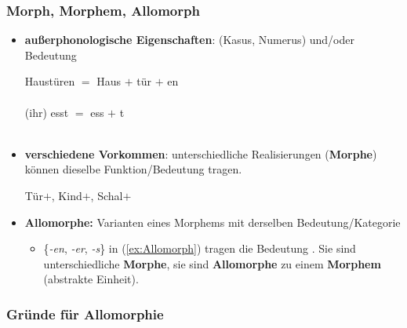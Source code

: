 \begin{frame}
\frametitle{Morph, Morphem, Allomorph}

\begin{itemize}
	\item \textbf{außerphonologische Eigenschaften}:  (\zB Kasus, Numerus) und/oder  Bedeutung
	
	\ea
		\ea
%		
		\gll Haustüren $=$ Haus $+$ tür $+$ en \\
		{} {}  {}  {}  \\
		
		\ex	
		\gll (ihr) esst $=$ ess $+$ t \\
		{} {} {}  {} \\
		
		\z
	\z 

\pause 
	
	\item \textbf{verschiedene Vorkommen}: unterschiedliche Realisierungen (\textbf{Morphe}) können dieselbe Funktion/Bedeutung tragen.
	
	\ea\label{ex:Allomorph} Tür$+$, Kind$+$, Schal$+$
	\z

\pause 
	
	\item \textbf{Allomorphe:} Varianten eines Morphems mit derselben Bedeutung/Kategorie
	
	\begin{itemize}
		\item \{\emph{-en}, \emph{-er}, \emph{-s}\} in (\ref{ex:Allomorph}) tragen die Bedeutung . Sie sind unterschiedliche \textbf{Morphe}, sie sind \textbf{Allomorphe} zu einem \textbf{Morphem} (abstrakte Einheit).
	\end{itemize}

\end{itemize}
\end{frame}


\subsubsection{Gründe für Allomorphie}


